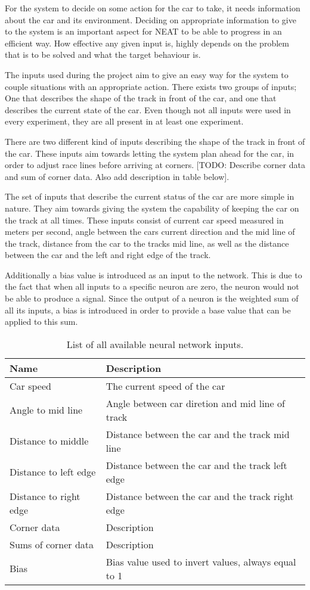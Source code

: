 For the system to decide on some action for the car to take, it needs information about the car and its environment. Deciding on appropriate information to give to the system is an important aspect for NEAT to be able to progress in an efficient way. How effective any given input is, highly depends on the problem that is to be solved and what the target behaviour is.

The inputs used during the project aim to give an easy way for the system to couple situations with an appropriate action. There exists two groups of inputs; One that describes the shape of the track in front of the car, and one that describes the current state of the car. Even though not all inputs were used in every experiment, they are all present in at least one experiment.

There are two different kind of inputs describing the shape of the track in front of the car. These inputs aim towards letting the system plan ahead for the car, in order to adjust race lines before arriving at corners. [TODO: Describe corner data and sum of corner data. Also add description in table below].

The set of inputs that describe the current status of the car are more simple in nature. They aim towards giving the system the capability of keeping the car on the track at all times. These inputs consist of current car speed measured in meters per second, angle between the cars current direction and the mid line of the track, distance from the car to the tracks mid line, as well as the distance between the car and the left and right edge of the track.

Additionally a bias value is introduced as an input to the network. This is due to the fact that when all inputs to a specific neuron are zero, the neuron would not be able to produce a signal. Since the output of a neuron is the weighted sum of all its inputs, a bias is introduced in order to provide a base value that can be applied to this sum.

\begin{table}[h!]
  \centering
  \begin{tabular}{ll}
    \toprule
    Name & Description\\
    \midrule
    Car speed  & The current speed of the car\\
    Angle to mid line & Angle between car diretion and mid line of track\\
    Distance to middle & Distance between the car and the track mid line\\
    Distance to left edge & Distance between the car and the track left edge\\
    Distance to right edge & Distance between the car and the track right edge\\
    Corner data  & Description\\
    Sums of corner data & Description\\
    Bias & Bias value used to invert values, always equal to 1\\
    \bottomrule
  \end{tabular}
  \caption{List of all available neural network inputs.}
  \label{tab:input_table}
\end{table}

